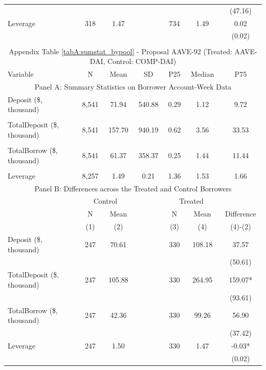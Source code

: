 \begin{table}[ht!]
\begin{tabular*}{\linewidth}{@{\extracolsep{\fill}}lcccccc }
          &       &       &       &       &       & (47.16) \\
    Leverage & 318   & 1.47  &       & 734   & 1.49  & 0.02 \\
          &       &       &       &       &       & (0.02) \\
    \bottomrule
              &       &       &       &       &       &  \\
      \multicolumn{7}{c}{Appendix Table \ref{tabA:sumstat_bypool} - Proposal AAVE-92 (Treated: AAVE-DAI, Control: COMP-DAI)} \\
      \toprule
     Variable  &N & Mean & SD & P25 & Median & P75 \\
     \midrule
    \multicolumn{7}{c}{Panel A: Summary Statistics on Borrower Account-Week Data} \\
    \midrule
    Deposit (\$, thousand) & 8,541 & 71.94 & 540.88 & 0.29  & 1.12  & 9.72 \\
          &       &       &       &       &       &  \\
    TotalDeposit (\$, thousand) & 8,541 & 157.70 & 940.19 & 0.62  & 3.56  & 33.53 \\
          &       &       &       &       &       &  \\
    TotalBorrow (\$, thousand) & 8,541 & 61.37 & 358.37 & 0.25  & 1.44  & 11.44 \\
          &       &       &       &       &       &  \\
    Leverage & 8,257 & 1.49  & 0.21  & 1.36  & 1.53  & 1.66 \\
    \midrule
        \multicolumn{7}{c}{Panel B: Differences across the Treated and Control Borrowers} \\
\midrule
          & \multicolumn{2}{c}{Control} &       & \multicolumn{2}{c}{Treated} &  \\
\cmidrule{2-3}\cmidrule{5-6}          & N & Mean &       & N & Mean & Difference \\
\cmidrule{2-3}\cmidrule{5-6}          & (1) & (2) &       & (3) & (4) & (4)-(2) \\
\cmidrule{2-7}    Deposit (\$, thousand) & 247   & 70.61 &       & 330   & 108.18 & 37.57 \\
          &       &       &       &       &       & (50.61) \\
    TotalDeposit (\$, thousand) & 247   & 105.88 &       & 330   & 264.95 & 159.07* \\
          &       &       &       &       &       & (93.61) \\
    TotalBorrow (\$, thousand) & 247   & 42.36 &       & 330   & 99.26 & 56.90 \\
          &       &       &       &       &       & (37.42) \\
    Leverage & 247   & 1.50  &       & 330   & 1.47  & -0.03* \\
          &       &       &       &       &       & (0.02) \\
    \bottomrule
          \end{tabular*} 



 \end{table}%


